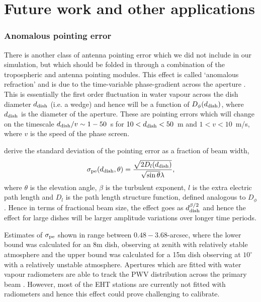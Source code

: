 \section{Future work and other applications}\label{sec:improv}

\subsubsection{Anomalous pointing error}
There is another class of antenna pointing error which we did not include in our simulation, but which should be folded in through a combination of the tropospheric and antenna pointing modules. This effect is called `anomalous refraction' and is due to the time-variable phase-gradient across the aperture \citep[e.g.][]{Holdaway_1997,Butler_1997,Holdaway_1998}. This is essentially the first order fluctuation in water vapour across the dish diameter $d_{\rm dish}$ (i.e. a wedge) and hence will be a function of $D_{\phi}(d_{\rm dish})$, where $d_{\rm dish}$ is the diameter of the aperture. These are pointing errors which will change on the timescale $d_{\rm dish}/v \sim 1-50$~s for $10<d_{\rm dish}<50$~m and $1<v<10$~m/s, where $v$ is the speed of the phase screen.  

\citet{Holdaway_1998} derive the standard deviation of the pointing error as a fraction of beam width,
\begin{equation}
 \sigma_{\rm pe}(d_{\rm dish},\theta) = \frac{\sqrt{2 D_l(d_{\rm dish})}}{\sqrt{\sin\theta}\lambda},
\end{equation}
where $\theta$ is the elevation angle, $\beta$ is the turbulent exponent, $l$ is the extra electric path length and $D_l$ is the path length structure function, defined analogous to $D_\phi$. Hence in terms of fractional beam size, the effect goes as $d_{\rm dish}^{\beta/2}$ and hence the effect for large dishes will be larger amplitude variations over longer time periods. 


Estimates of $\sigma_{\rm pe}$ shown in \citet{Holdaway_1998} range between $0.48-3.68$-arcsec, where the lower bound was calculated for an 8m dish, observing at zenith with relatively stable atmosphere and the upper bound was calculated for a 15m dish observing at $10^\circ$ with a relatively unstable atmosphere. Apertures which are fitted with water vapour radiometers are able to track the PWV distribution across the primary beam \citep{Lamb_1998}. However, most of the EHT stations are currently not fitted with radiometers and hence this effect could prove challenging to calibrate.

